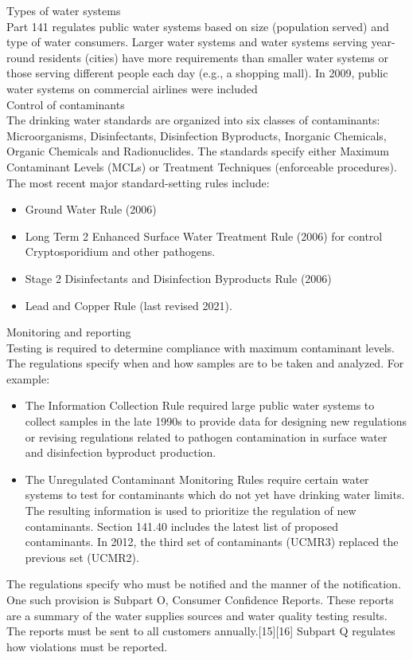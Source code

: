 \documentclass{article}
\begin{document}
Types of water systems\\
Part 141 regulates public water systems based on size (population served) and type of water consumers. Larger water systems and water systems serving year-round residents (cities) have more requirements than smaller water systems or those serving different people each day (e.g., a shopping mall). In 2009, public water systems on commercial airlines were included\\
Control of contaminants\\
The drinking water standards are organized into six classes of contaminants: Microorganisms, Disinfectants, Disinfection Byproducts, Inorganic Chemicals, Organic Chemicals and Radionuclides. The standards specify either Maximum Contaminant Levels (MCLs) or Treatment Techniques (enforceable procedures).\\ 
The most recent major standard-setting rules include:
\begin{itemize}
\item Ground Water Rule (2006)
\item Long Term 2 Enhanced Surface Water Treatment Rule (2006) for control  Cryptosporidium and other pathogens. 
\item Stage 2 Disinfectants and Disinfection Byproducts Rule (2006)
\item Lead and Copper Rule (last revised 2021).
\end{itemize}
Monitoring and reporting\\
Testing is required to determine compliance with maximum contaminant levels. The regulations specify when and how samples are to be taken and analyzed. For example:
\begin{itemize}
\item The Information Collection Rule required large public water systems to collect samples in the late 1990s to provide data for designing new regulations or revising regulations related to pathogen contamination in surface water and disinfection byproduct production.
\item The Unregulated Contaminant Monitoring Rules require certain water systems to test for contaminants which do not yet have drinking water limits. The resulting information is used to prioritize the regulation of new contaminants. Section 141.40 includes the latest list of proposed contaminants. In 2012, the third set of contaminants (UCMR3) replaced the previous set (UCMR2).\\ 
\end{itemize}
The regulations specify who must be notified and the manner of the notification. One such provision is Subpart O, Consumer Confidence Reports. These reports are a summary of the water supplies sources and water quality testing results. The reports must be sent to all customers annually.[15][16] Subpart Q regulates how violations must be reported.\\
\end{document}
